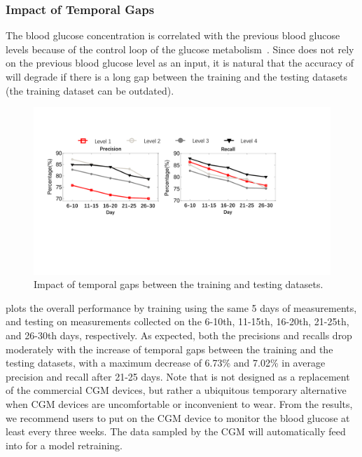 \subsubsection{Impact of Temporal Gaps}
The blood glucose concentration is correlated with the previous blood glucose levels because of the control loop of the glucose metabolism~\cite{bib:TBE07:Dalla, bib:PE04:Hovorka, bib:IJNMBE16:Oviedo}.
Since \sysname does not rely on the previous blood glucose level as an input, it is natural that the accuracy of \sysname will degrade if there is a long gap between the training and the testing datasets (\ie the training dataset can be outdated).

\begin{figure}[h]
  \centering
  \includegraphics[width=0.9\columnwidth]{./img/Performance_gap1.pdf}
  \caption{Impact of temporal gaps between the training and testing datasets.}
  \label{fig:per_under_various_pred_days}
\end{figure}

 plots the overall performance by training using the same 5 days of measurements, and testing on measurements collected on the 6-10th, 11-15th, 16-20th, 21-25th, and 26-30th days, respectively.
As expected, both the precisions and recalls drop moderately with the increase of temporal gaps between the training and the testing datasets, with a maximum decrease of 6.73\% and 7.02\% in average precision and recall after 21-25 days.
Note that \sysname is not designed as a replacement of the commercial CGM devices, but rather a ubiquitous temporary alternative when CGM devices are uncomfortable or inconvenient to wear.
From the results, we recommend \sysname users to put on the CGM device to monitor the blood glucose at least every three weeks.
The data sampled by the CGM will automatically feed into \sysname for a model retraining.




